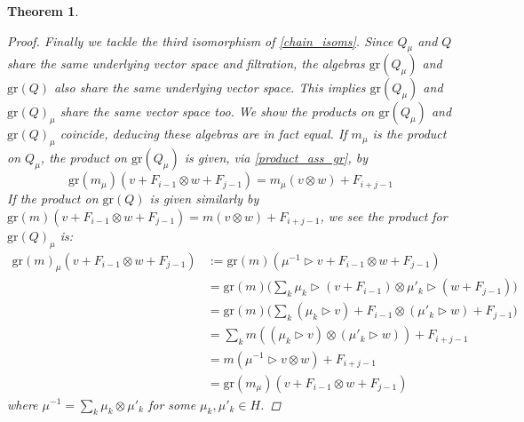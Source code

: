\documentclass[10pt]{article}
\newcommand{\bb}{\medbreak}
\newcommand{\nt}{\noindent}
\newcommand{\gr}{\text{gr}}
\newtheorem{theorem}[lemma]{Theorem}
\theoremstyle{definition}
\begin{document}
\begin{theorem}
\begin{proof}
\nt Finally we tackle the third isomorphism of \eqref{chain_isoms}. Since $Q_\mu$ and $Q$ share the same underlying vector space and filtration, the algebras $\gr(Q_\mu)$ and $\gr(Q)$ also share the same underlying vector space. This implies $\gr(Q_\mu)$ and $\gr(Q)_\mu$ share the same vector space too. We show the products on $\gr(Q_\mu)$ and $\gr(Q)_\mu$ coincide, deducing these algebras are in fact equal. If $m_\mu$ is the product on $Q_\mu$, the product on $\gr(Q_\mu)$ is given, via \eqref{product_ass_gr}, by
\begin{equation*}\label{mu_gr_product}
\gr(m_\mu)(v+F_{i-1}\otimes w+F_{j-1})=m_\mu(v\otimes w)+F_{i+j-1}
\end{equation*}
If the product on $\gr(Q)$ is given similarly by $\gr(m)(v+F_{i-1}\otimes w+F_{j-1})=m(v\otimes w)+F_{i+j-1}$, we see the product for $\gr(Q)_\mu$ is:
\begin{align*}
\gr(m)_\mu(v+F_{i-1}\otimes w+F_{j-1}) & :=\gr(m)(\mu^{-1}\rhd v+F_{i-1}\otimes w+F_{j-1})\\
& = \gr(m)\bigg(\sum_k \mu_k\rhd (v+F_{i-1})\otimes \mu'_k\rhd (w+F_{j-1}) \bigg)\\
& = \gr(m)\bigg(\sum_k (\mu_k\rhd v)+F_{i-1}\otimes (\mu'_k\rhd w)+F_{j-1}\bigg)\\
& = \sum_k m((\mu_k\rhd v)\otimes (\mu'_k\rhd w))+F_{i+j-1}\\
& = m(\mu^{-1}\rhd v\otimes w)+F_{i+j-1}\\
& = \gr(m_\mu)(v+F_{i-1}\otimes w+F_{j-1})
\end{align*}
where $\mu^{-1}=\sum_k \mu_k\otimes \mu'_k$ for some $\mu_k,\mu'_k\in H$.


\end{proof}
\end{theorem}
\end{document}
